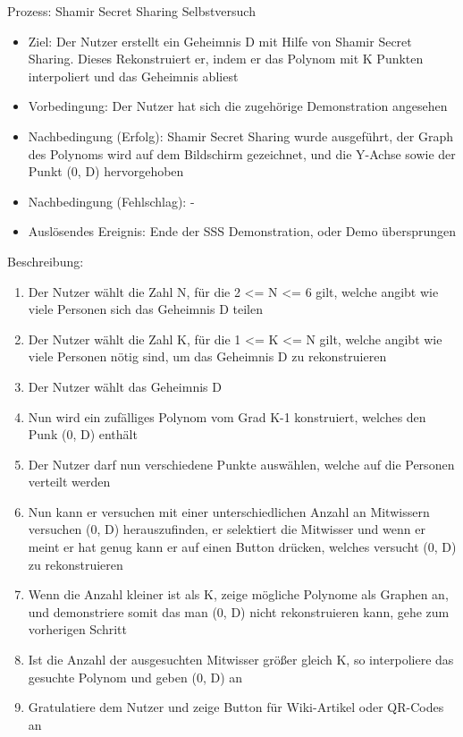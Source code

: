 \documentclass{article}
\begin{document}
\begin{FA}[start=100]
\item Prozess: Shamir Secret Sharing Selbstversuch
\end{FA}
\begin{itemize}[label={}]
    \item Ziel: Der Nutzer erstellt ein Geheimnis D
        mit Hilfe von Shamir Secret Sharing.
        Dieses Rekonstruiert er, indem er das Polynom
        mit K Punkten interpoliert und das Geheimnis
        abliest
    \item Vorbedingung: Der Nutzer hat sich die zugehörige
        Demonstration angesehen
    \item Nachbedingung (Erfolg): Shamir Secret Sharing wurde
        ausgeführt, der Graph des Polynoms wird auf dem
        Bildschirm gezeichnet, und die Y-Achse
        sowie der Punkt (0, D) hervorgehoben
    \item Nachbedingung (Fehlschlag): -
    \item Auslösendes Ereignis: Ende der SSS Demonstration,
        oder Demo übersprungen
\end{itemize}

Beschreibung:
\begin{enumerate}
    \item Der Nutzer wählt die Zahl N,
        für die 2 <= N <= 6 gilt, welche
        angibt wie viele Personen sich das
        Geheimnis D teilen
    \item Der Nutzer wählt die Zahl K,
        für die 1 <= K <= N gilt, welche
        angibt wie viele Personen nötig
        sind, um das Geheimnis D zu
        rekonstruieren
    \item Der Nutzer wählt das Geheimnis D
    \item Nun wird ein zufälliges Polynom
        vom Grad K-1 konstruiert, welches
        den Punk (0, D) enthält
    \item Der Nutzer darf nun verschiedene
        Punkte auswählen, welche auf
        die Personen verteilt werden
    \item Nun kann er versuchen mit
        einer unterschiedlichen Anzahl
        an Mitwissern versuchen (0, D)
        herauszufinden, er selektiert
        die Mitwisser und wenn er meint
        er hat genug kann er auf
        einen Button drücken, welches
        versucht (0, D) zu rekonstruieren
    \item Wenn die Anzahl kleiner ist als
        K, zeige mögliche Polynome als
        Graphen an, und demonstriere somit
        das man (0, D) nicht rekonstruieren
        kann, gehe zum vorherigen Schritt
    \item Ist die Anzahl der ausgesuchten
        Mitwisser größer gleich K, so
        interpoliere das gesuchte Polynom
        und geben (0, D) an
    \item Gratulatiere dem Nutzer und
        zeige Button für Wiki-Artikel
        oder QR-Codes an
\end{enumerate}
\end{document}
